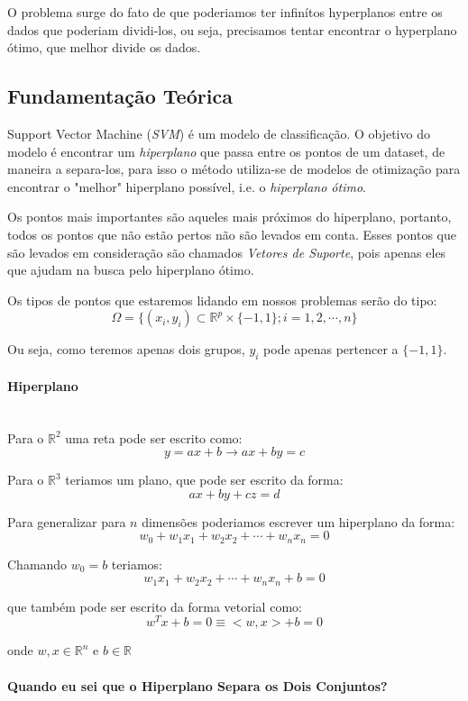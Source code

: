 \documentclass{article}
\begin{document}
O problema surge do fato de que poderiamos ter infinítos hyperplanos entre os dados que poderiam dividi-los, ou seja, precisamos tentar encontrar o hyperplano ótimo, que melhor divide os dados.

\subsection{Fundamentação Teórica}
Support Vector Machine (\textit{SVM}) é um modelo de classificação.
O objetivo do modelo é encontrar um \textit{hiperplano} que passa entre os pontos de um dataset, de maneira a separa-los, para isso o método utiliza-se de modelos de otimização para encontrar o "melhor" hiperplano possível, i.e. o \textit{hiperplano ótimo}. 

Os pontos mais importantes são aqueles mais próximos do hiperplano, portanto, todos os pontos que não estão pertos não são levados em conta. Esses pontos que são levados em consideração são chamados \textit{Vetores de Suporte}, pois apenas eles que ajudam na busca pelo hiperplano ótimo.

Os tipos de pontos que estaremos lidando em nossos problemas serão do tipo:
\[\Omega =\{(x_i,y_i)\subset\mathbb{R}^{p}\times\{-1,1\};i=1,2,\cdots,n\}\]

Ou seja, como teremos apenas dois grupos, \(y_i\) pode apenas pertencer a \(\{-1,1\}\).

\paragraph{Hiperplano} \hspace{0pt}\\

Para o \(\mathbb{R}^2\) uma reta pode ser escrito como:
\[y=ax+b\rightarrow ax+by=c\]

Para o \(\mathbb{R}^3\) teriamos um plano, que pode ser escrito da forma:
\[ax+by+cz=d\]

Para generalizar para \(n\) dimensões poderiamos escrever um hiperplano da forma:
\[w_0+w_1x_1+w_2x_2+\cdots+w_nx_n=0\]

Chamando \(w_0=b\) teriamos:
\[w_1x_1+w_2x_2+\cdots+w_nx_n+b=0\]

que também pode ser escrito da forma vetorial como:
\[w^Tx+b=0\equiv <w,x>+b=0\]

onde \(w,x\in\mathbb{R}^n\) e \(b\in\mathbb{R}\)

\paragraph{Quando eu sei que o Hiperplano Separa os Dois Conjuntos?}\hspace{0pt}\\
\end{document}
